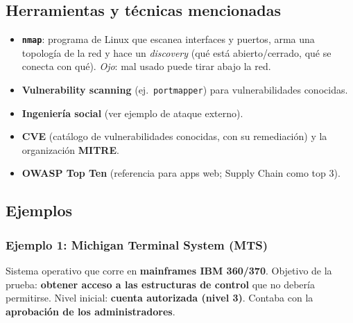 \documentclass[../main.tex]{subfiles}
\begin{document}
\subsection{Herramientas y técnicas mencionadas}

\begin{itemize}
    \item \textbf{\texttt{nmap}}: programa de Linux que escanea interfaces y puertos, arma una
    topología de la red y hace un \emph{discovery} (qué está abierto/cerrado, qué se conecta
    con qué). \emph{Ojo}: mal usado puede tirar abajo la red.
    \item \textbf{Vulnerability scanning} (ej.\ \texttt{portmapper}) para vulnerabilidades
    conocidas.
    \item \textbf{Ingeniería social} (ver ejemplo de ataque externo).
    \item \textbf{CVE} (catálogo de vulnerabilidades conocidas, con su remediación) y la
    organización \textbf{MITRE}.
    \item \textbf{OWASP Top Ten} (referencia para apps web; Supply Chain como top 3).
\end{itemize}

\subsection{Ejemplos}

\subsubsection{Ejemplo 1: Michigan Terminal System (MTS)}

Sistema operativo que corre en \textbf{mainframes IBM 360/370}. Objetivo de la prueba:
\textbf{obtener acceso a las estructuras de control} que no debería permitirse. Nivel inicial:
\textbf{cuenta autorizada (nivel 3)}. Contaba con la \textbf{aprobación de los administradores}.
\end{document}
